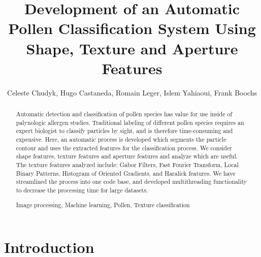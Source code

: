 \documentclass[runningheads,a4paper]{llncs}
\newcommand{\keywords}[1]{\par\addvspace\baselineskip
\noindent\keywordname\enspace\ignorespaces#1}
\begin{document}
\mainmatter  %

\title{Development of an Automatic Pollen Classification System Using Shape,
Texture and Aperture Features}



\author{Celeste Chudyk, Hugo Castaneda, Romain Leger, Islem Yahiaoui, Frank Boochs%
}


\maketitle



\begin{abstract}
Automatic detection and classification of pollen species has value for use inside of palynologic allergen studies. Traditional labeling of different pollen species requires an expert biologist to classify particles by sight, and is therefore time-consuming and expensive. Here, an automatic process is developed which segments the particle contour and uses the extracted features for the classification process. We consider shape features, texture features and aperture features and analyze which are useful. The texture features analyzed include: Gabor Filters, Fast Fourier Transform, Local Binary Patterns, Histogram of Oriented Gradients, and Haralick features. We have streamlined the process into one code base, and developed multithreading functionality to decrease the processing time for large datasets.
\keywords{Image processing, Machine learning, Pollen, Texture classification}
\end{abstract}

  
  
  
  

\section{Introduction}
\end{document}
